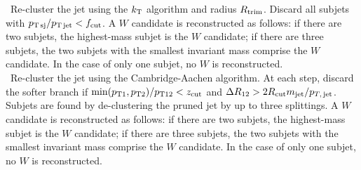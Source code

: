 ~Re-cluster the jet using the $k_{\rm T}$ algorithm and radius $R_{\rm trim}$. Discard all subjets with $p_{\rm T\,sj}/p_{\rm T\,jet} < f_{\rm cut}$. A $W$ candidate is reconstructed as follows: if there are two subjets, the highest-mass subjet is the $W$ candidate; if there are three subjets, the two subjets with the smallest invariant mass comprise the $W$ candidate. In the case of only one subjet, no $W$ is reconstructed.\\

~Re-cluster the jet using the Cambridge-Aachen algorithm. At each step, discard the softer branch if $\mathrm{min}(p_{\rm T1},p_{\rm T2}) / p_{\rm T12} < z_{\rm cut}$ and $\Delta R_{12}>2R_{\rm cut}m_{\rm jet}/p_{T,\,\mathrm{jet}}$. Subjets are found by de-clustering the pruned jet by up to three splittings. A $W$ candidate is reconstructed as follows: if there are two subjets, the highest-mass subjet is the $W$ candidate; if there are three subjets, the two subjets with the smallest invariant mass comprise the $W$ candidate. In the case of only one subjet, no $W$ is reconstructed.
